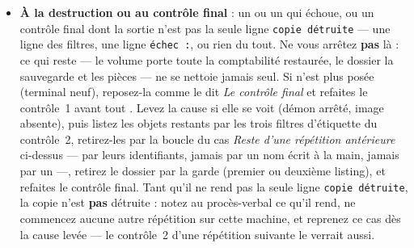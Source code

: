\documentclass[a4paper,11pt,oneside]{article}
\begin{document}
\begin{itemize}
\begin{lstlisting}[language=bash]
F=label=com.docker.compose.project=kesh-repetition
for c in $(docker ps -a -q --filter "$F"); do docker rm -f "$c"; done
for v in $(docker volume ls -q --filter "$F"); do docker volume rm "$v"; done
for n in $(docker network ls -q --filter "$F"); do docker network rm "$n"; done
\end{lstlisting}
    puis le dossier, s'il existe, par la garde --- le premier ou le deuxième listing de \emph{Détruire la copie}, l'ancienne copie ayant pu démarrer ---, et le contrôle final. S'il a disparu, posez  au chemin qu'il avait (son nom porte sa date) avant le contrôle final, faute de quoi celui-ci rend \texttt{échec : COPIE n'est pas posée} ; si cette date est inconnue, le chemin de la répétition que vous alliez commencer convient,  n'ayant rendu aucun dossier. Repartez ensuite du contrôle~1.
    \item \textbf{À la destruction ou au contrôle final} : un  ou un  qui échoue, ou un contrôle final dont la sortie n'est pas la seule ligne \texttt{copie détruite} --- une ligne des filtres, une ligne \texttt{échec :}, ou rien du tout. Ne vous arrêtez \textbf{pas} là : ce qui reste --- le volume porte toute la comptabilité restaurée, le dossier la sauvegarde et les pièces --- ne se nettoie jamais seul. Si  n'est plus posée (terminal neuf), reposez-la comme le dit \emph{Le contrôle final} et refaites le contrôle~1 avant tout . Levez la cause si elle se voit (démon arrêté, image absente), puis listez les objets restants par les trois filtres d'étiquette du contrôle~2, retirez-les par la boucle du cas \emph{Reste d'une répétition antérieure} ci-dessus --- par leurs identifiants, jamais par un nom écrit à la main, jamais par un  ---, retirez le dossier par la garde (premier ou deuxième listing), et refaites le contrôle final. Tant qu'il ne rend pas la seule ligne \texttt{copie détruite}, la copie n'est \textbf{pas} détruite : notez au procès-verbal ce qu'il rend, ne commencez aucune autre répétition sur cette machine, et reprenez ce cas dès la cause levée --- le contrôle~2 d'une répétition suivante le verrait aussi.
\end{itemize}
\end{document}
